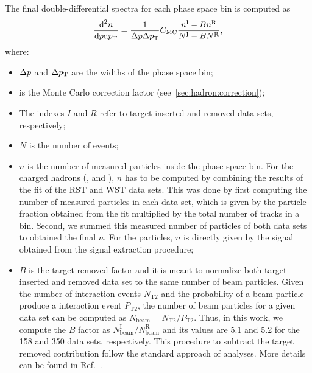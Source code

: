 The final double-differential spectra for each
phase space bin is computed as
\begin{equation}
  \frac{\text{d}^2n}{\text{d}p\text{d}p_\text{T}} = \frac{1}{\Delta p\Delta p_\text{T}} \mbox{$C_\text{MC}$}
  \frac{n^\text{I}-Bn^\text{R}}{N^\text{I}-BN^\text{R}},
  \label{eq:hadron:spec}
\end{equation}
where:
\begin{itemize}

\item $\Delta p$ and $\Delta p_\text{T}$ are the widths of the phase space bin;

\item \cmc is the Monte Carlo correction factor (see~\cref{sec:hadron:correction});

\item The indexes $I$ and $R$ refer to target inserted and removed data sets, respectively;
  
\item $N$ is the number of events;

\item $n$ is the number of measured particles inside the phase space bin.
  For the charged hadrons (\pions, \kaons and \protonpm),
  $n$ has to be computed by combining the results of the \dedx fit of
  the RST and WST data sets. This was done by first computing
  the number of measured particles in each data set,
  which is given by the particle fraction obtained
  from the \dedx fit multiplied by the total
  number of tracks in a bin. Second, we summed this measured
  number of particles of both data sets to obtained the final $n$.
  For the \vzero particles, $n$ is directly given by the signal obtained
  from the signal extraction procedure;

\item $B$ is the target removed factor and it is meant to normalize
  both target inserted and removed data set to the same
  number of beam particles. Given the number of interaction events
  $N_\text{T2}$ and the probability of a beam particle produce a
  interaction event $P_\text{T2}$, the number of beam particles
  for a given data set can be computed as $N_\text{beam} = N_\text{T2}/P_\text{T2}$. 
  Thus, in this work, we compute the $B$ factor as 
  $N_\text{beam}^\text{I}/N_\text{beam}^\text{R}$ and its values are 5.1 and 5.2
  for the 158 and 350 \GeVc data sets, respectively. 
  This procedure to subtract
  the target removed contribution follow the standard approach
  of \NASixtyOne analyses. More details can be found in Ref.~\cite{AntoniMThesis}.
  
\end{itemize}

